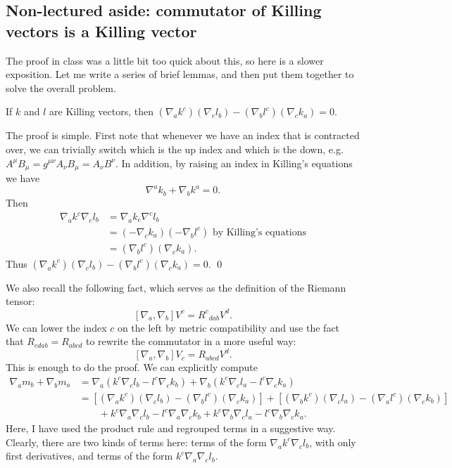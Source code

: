 \subsection*{Non-lectured aside: commutator of Killing vectors is a Killing vector} The proof in class was a little bit too quick about this, so here is a slower exposition. Let me write a series of brief lemmas, and then put them together to solve the overall problem.

\begin{lem}\label{killinglemma}
If $k$ and $l$ are Killing vectors, then $(\nabla_a k^c)(\nabla_c l_b)-(\nabla_b l^c )(\nabla_c k_a)=0$.
\end{lem}
The proof is simple. First note that whenever we have an index that is contracted over, we can trivially switch which is the up index and which is the down, e.g. $A^\mu B_\mu=g^{\mu\nu} A_\nu B_\mu= A_\nu B^\nu$. In addition, by raising an index in Killing's equations we have
$$\nabla^a k_b + \nabla_b k^a = 0.$$
Then
\begin{align*}
\nabla_a k^c \nabla_c l_b &= \nabla_a k_c \nabla^c l_b\\
&=(-\nabla_c k_a)(-\nabla_b l^c)\text{ by Killing's equations}\\
&=(\nabla_b l^c)(\nabla_c k_a). 
\end{align*}
Thus $(\nabla_a k^c)(\nabla_c l_b)-(\nabla_b l^c )(\nabla_c k_a)=0$. \qed

We also recall the following fact, which serves as the definition of the Riemann tensor:
$$[\nabla_a,\nabla_b]V^c={R^c}_{dab}V^d.$$
We can lower the index $c$ on the left by metric compatibility and use the fact that $R_{cdab}=R_{abcd}$ to rewrite the commutator in a more useful way:
\begin{equation}\label{riemannascommutator}
[\nabla_a,\nabla_b]V_c=R_{abcd}V^d.
\end{equation}
%
This is enough to do the proof. We can explicitly compute
\begin{align*}
\nabla_a m_b +\nabla_b m_a &= \nabla_a (k^c \nabla_c l_b - l^c \nabla_c k_b)+\nabla_b (k^c \nabla_c l_a -l^c \nabla_c k_a)\\
&= \left[(\nabla_a k^c)( \nabla_c l_b) -(\nabla_b l^c)( \nabla_c k_a)\right]+ \left[(\nabla_b k^c)( \nabla_c l_a)-(\nabla_a l^c )(\nabla_c k_b)\right]  \\
&{}\qquad+k^c \nabla_a \nabla_c l_b - l^c \nabla_a \nabla_c k_b +k^c \nabla_b \nabla_c l_a - l^c \nabla_b \nabla_c k_a.
\end{align*}
Here, I have used the product rule and regrouped terms in a suggestive way. Clearly, there are two kinds of terms here: terms of the form $\nabla_a k^c \nabla_c l_b$, with only first derivatives, and terms of the form $k^c \nabla_a \nabla_c l_b.$

